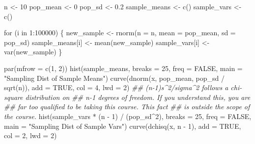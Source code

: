 \documentclass[
  letterpaper,
  DIV=11,
  numbers=noendperiod,
  oneside]{scrreprt}
\newenvironment{Shaded}{\begin{snugshade}}{\end{snugshade}}
\newcommand{\AttributeTok}[1]{\textcolor[rgb]{0.40,0.45,0.13}{#1}}
\newcommand{\ConstantTok}[1]{\textcolor[rgb]{0.56,0.35,0.01}{#1}}
\newcommand{\ControlFlowTok}[1]{\textcolor[rgb]{0.00,0.23,0.31}{#1}}
\newcommand{\DecValTok}[1]{\textcolor[rgb]{0.68,0.00,0.00}{#1}}
\newcommand{\DocumentationTok}[1]{\textcolor[rgb]{0.37,0.37,0.37}{\textit{#1}}}
\newcommand{\FloatTok}[1]{\textcolor[rgb]{0.68,0.00,0.00}{#1}}
\newcommand{\FunctionTok}[1]{\textcolor[rgb]{0.28,0.35,0.67}{#1}}
\newcommand{\NormalTok}[1]{\textcolor[rgb]{0.00,0.23,0.31}{#1}}
\newcommand{\OtherTok}[1]{\textcolor[rgb]{0.00,0.23,0.31}{#1}}
\newcommand{\SpecialCharTok}[1]{\textcolor[rgb]{0.37,0.37,0.37}{#1}}
\newcommand{\StringTok}[1]{\textcolor[rgb]{0.13,0.47,0.30}{#1}}
\begin{document}
\begin{Shaded}
\begin{Highlighting}[]
\NormalTok{n }\OtherTok{\textless{}{-}} \DecValTok{10}
\NormalTok{pop\_mean }\OtherTok{\textless{}{-}} \DecValTok{0}
\NormalTok{pop\_sd }\OtherTok{\textless{}{-}} \FloatTok{0.2}
\NormalTok{sample\_means }\OtherTok{\textless{}{-}} \FunctionTok{c}\NormalTok{()}
\NormalTok{sample\_vars }\OtherTok{\textless{}{-}} \FunctionTok{c}\NormalTok{()}

\ControlFlowTok{for}\NormalTok{ (i }\ControlFlowTok{in} \DecValTok{1}\SpecialCharTok{:}\DecValTok{100000}\NormalTok{) \{}
\NormalTok{    new\_sample }\OtherTok{\textless{}{-}} \FunctionTok{rnorm}\NormalTok{(}\AttributeTok{n =}\NormalTok{ n, }\AttributeTok{mean =}\NormalTok{ pop\_mean, }\AttributeTok{sd =}\NormalTok{ pop\_sd)}
\NormalTok{    sample\_means[i] }\OtherTok{\textless{}{-}} \FunctionTok{mean}\NormalTok{(new\_sample)}
\NormalTok{    sample\_vars[i] }\OtherTok{\textless{}{-}} \FunctionTok{var}\NormalTok{(new\_sample)}
\NormalTok{\}}

\FunctionTok{par}\NormalTok{(}\AttributeTok{mfrow =} \FunctionTok{c}\NormalTok{(}\DecValTok{1}\NormalTok{, }\DecValTok{2}\NormalTok{))}
\FunctionTok{hist}\NormalTok{(sample\_means, }\AttributeTok{breaks =} \DecValTok{25}\NormalTok{, }\AttributeTok{freq =} \ConstantTok{FALSE}\NormalTok{,}
    \AttributeTok{main =} \StringTok{"Sampling Dist of Sample Means"}\NormalTok{)}
\FunctionTok{curve}\NormalTok{(}\FunctionTok{dnorm}\NormalTok{(x, pop\_mean, pop\_sd }\SpecialCharTok{/} \FunctionTok{sqrt}\NormalTok{(n)), }\AttributeTok{add =} \ConstantTok{TRUE}\NormalTok{,}
    \AttributeTok{col =} \DecValTok{4}\NormalTok{, }\AttributeTok{lwd =} \DecValTok{2}\NormalTok{)}
\DocumentationTok{\#\# (n{-}1)s\^{}2/sigma\^{}2 follows a chi{-}square distribution on}
\DocumentationTok{\#\# n{-}1 degrees of freedom. If you understand this, you are}
\DocumentationTok{\#\# far too qualified to be taking this course. This fact}
\DocumentationTok{\#\# is outside the scope of the course.}
\FunctionTok{hist}\NormalTok{(sample\_vars }\SpecialCharTok{*}\NormalTok{ (n }\SpecialCharTok{{-}} \DecValTok{1}\NormalTok{) }\SpecialCharTok{/}\NormalTok{ (pop\_sd}\SpecialCharTok{\^{}}\DecValTok{2}\NormalTok{), }\AttributeTok{breaks =} \DecValTok{25}\NormalTok{, }\AttributeTok{freq =} \ConstantTok{FALSE}\NormalTok{,}
    \AttributeTok{main =} \StringTok{"Sampling Dist of Sample Vars"}\NormalTok{)}
\FunctionTok{curve}\NormalTok{(}\FunctionTok{dchisq}\NormalTok{(x, n }\SpecialCharTok{{-}} \DecValTok{1}\NormalTok{), }\AttributeTok{add =} \ConstantTok{TRUE}\NormalTok{, }\AttributeTok{col =} \DecValTok{2}\NormalTok{, }\AttributeTok{lwd =} \DecValTok{2}\NormalTok{)}
\end{Highlighting}
\end{Shaded}
\end{document}

